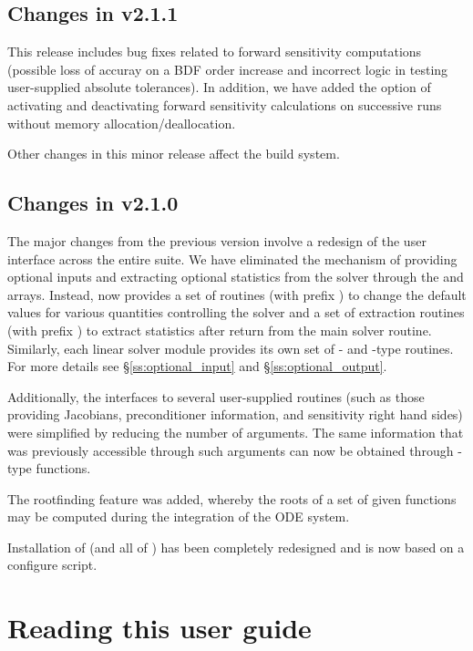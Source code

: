 \subsection*{Changes in v2.1.1}

This {\cvodes} release includes bug fixes related to forward sensitivity
computations (possible loss of accuray on a BDF order increase and incorrect
logic in testing user-supplied absolute tolerances). 
In addition, we have added the option of activating and deactivating
forward sensitivity calculations on successive {\cvodes} runs without memory
allocation/deallocation.

Other changes in this minor {\sundials} release affect the build system.

\subsection*{Changes in v2.1.0}

The major changes from the previous version involve a redesign of the
user interface across the entire {\sundials} suite. We have eliminated the
mechanism of providing optional inputs and extracting optional statistics 
from the solver through the  and  arrays. Instead,
{\cvodes} now provides a set of routines (with prefix )
to change the default values for various quantities controlling the
solver and a set of extraction routines (with prefix )
to extract statistics after return from the main solver routine.
Similarly, each linear solver module provides its own set of {-}
and {-type} routines. For more details see \S\ref{ss:optional_input}
and \S\ref{ss:optional_output}.

Additionally, the interfaces to several user-supplied routines
(such as those providing Jacobians, preconditioner information, and
sensitivity right hand sides) were simplified by reducing the number
of arguments. The same information that was previously accessible
through such arguments can now be obtained through {-type}
functions.

The rootfinding feature was added, whereby the roots of a set of given
functions may be computed during the integration of the ODE system.

Installation of {\cvodes} (and all of {\sundials}) has been completely 
redesigned and is now based on a configure script.


\section{Reading this user guide}\label{ss:reading}

